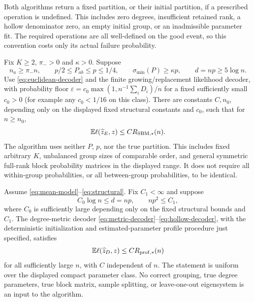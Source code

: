 Both algorithms return a fixed partition, or their initial partition,
if a prescribed operation is undefined. This includes zero degrees,
insufficient retained rank, a hollow denominator zero, an empty initial
group, or an inadmissible parameter fit. The required operations are all
well-defined on the good event, so this convention costs only its actual
failure probability.

\begin{theorem}\label{thm:sbm}
Fix $K\ge2$, $\pi_->0$ and $\kappa>0$. Suppose
\[
 n_a\ge\pi_-n,\qquad
 p/2\le P_{ab}\le p\le1/4,\qquad
 \sigma_{\min}(P)\ge\kappa p,\qquad d=np\ge5\log n.
\]
Use \eqref{eq:euclidean-decoder} and the finite growing/replacement
likelihood decoder, with probability floor
$\varepsilon=c_0\max(1,n^{-1}\sum_iD_i)/n$ for a fixed sufficiently small
$c_0>0$ (for example any $c_0<1/16$ on this class).
There are constants $C,n_0$, depending only on the displayed fixed
structural constants and $c_0$, such that for $n\ge n_0$,
\begin{equation}\label{eq:sbm-risk}
 \mathbb E\ell(\widehat z_E,z)\le C R_{\mathrm{SBM},*}(n).
\end{equation}
The algorithm uses neither $P$, $p$, nor the true partition.
This includes fixed arbitrary $K$, unbalanced group sizes of comparable
order, and general symmetric full-rank block probability matrices in the
displayed range. It does not require all within-group probabilities, or all
between-group probabilities, to be identical.
\end{theorem}

\begin{theorem}
\label{thm:dc}
Assume \eqref{eq:mean-model}--\eqref{eq:structural}. Fix $C_1<\infty$ and
suppose
\begin{equation}\label{eq:dc-range}
 C_0\log n\le d=np,\qquad np^2\le C_1,
\end{equation}
where $C_0$ is sufficiently large depending only on the fixed structural
bounds and $C_1$. The degree-metric decoder
\eqref{eq:metric-decoder}--\eqref{eq:hollow-decoder}, with the deterministic
initialization and estimated-parameter profile procedure just specified,
satisfies
\begin{equation}\label{eq:dc-risk}
 \mathbb E\ell(\widehat z_D,z)\le C R_{\mathrm{prof},*}(n)
\end{equation}
for all sufficiently large $n$, with $C$ independent of $n$.
The statement is uniform over the displayed compact parameter class.
No correct grouping, true degree parameters, true block matrix, sample
splitting, or leave-one-out eigensystem is an input to the algorithm.
\end{theorem}

